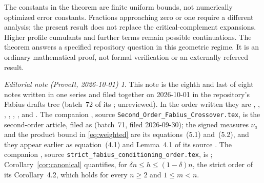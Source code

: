 \documentclass[11pt,a4paper]{article}
\theoremstyle{remark}\newtheorem*{ednote}{Editorial note (ProveIt, 2026-10-01)}
\begin{document}
The constants in the theorem are finite uniform bounds, not numerically optimized error constants. Fractions approaching zero or one require a different analysis; the present result does not replace the critical-complement expansions. Higher profile cumulants and further terms remain possible continuations. The theorem answers a specified repository question in this geometric regime. It is an ordinary mathematical proof, not formal verification or an externally refereed result.
\begin{ednote}
This note is the eighth and last of eight notes written in one series and filed together on 2026-10-01 in the repository's Fabius drafts tree (batch~72 of its ; unreviewed). In the order written they are , , , , , ,  and . 
The companion \cite{Critical}, source
\texttt{Second\_Order\_Fabius\_Crossover.tex}, is the second-order article,
filed as  (batch~71, filed 2026-09-30); the signed
measures $\nu_a$ and the product bound in \eqref{eq:weighted} are its
equations~(5.1) and~(5.2), and they appear earlier as equation~(4.1) and
Lemma~4.1 of its source . The companion \cite{Strict},
source \texttt{strict\_fabius\_conditioning\_order.tex}, is
; Corollary~\ref{cor:canonical}
quantifies, for $\delta n\le h\le(1-\delta)n$, the strict order of its
Corollary~4.2, which holds for every $n\ge2$ and $1\le m<n$.
\end{ednote}
\end{document}
